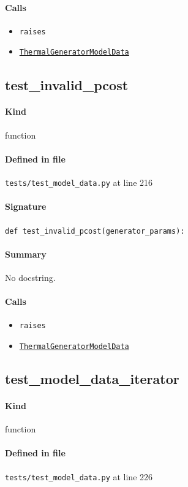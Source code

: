 \documentclass[11pt]{report}
\begin{document}
\paragraph{Calls}
\begin{itemize}[leftmargin=*]
  \item \texttt{raises}
  \item \hyperref[def:model_data.py:ThermalGeneratorModelData:L185]{\texttt{ThermalGeneratorModelData}}
\end{itemize}
\subsection{test\_invalid\_pcost}
\label{def:tests-test_model_data.py:test_invalid_pcost:L216}
\paragraph{Kind} function
\paragraph{Defined in file} \texttt{tests/test\_model\_data.py} at line 216
\paragraph{Signature} \texttt{def test\_invalid\_pcost(generator\_params):}
\paragraph{Summary} No docstring.
\paragraph{Calls}
\begin{itemize}[leftmargin=*]
  \item \texttt{raises}
  \item \hyperref[def:model_data.py:ThermalGeneratorModelData:L185]{\texttt{ThermalGeneratorModelData}}
\end{itemize}
\subsection{test\_model\_data\_iterator}
\label{def:tests-test_model_data.py:test_model_data_iterator:L226}
\paragraph{Kind} function
\paragraph{Defined in file} \texttt{tests/test\_model\_data.py} at line 226
\end{document}
